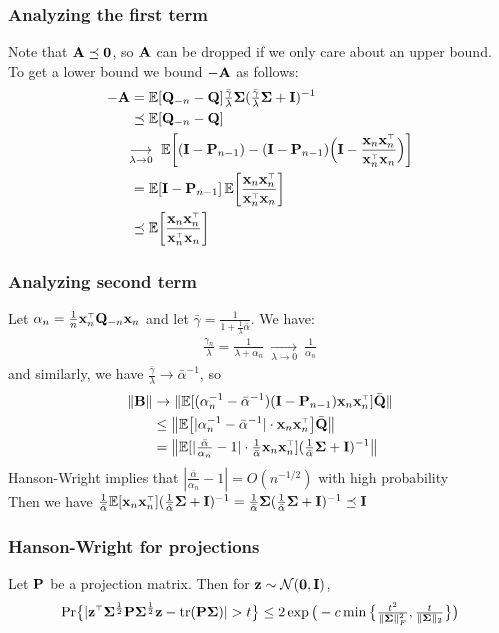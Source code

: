 \documentclass[10pt]{beamer}
\begin{document}
\begin{frame}
  \frametitle{Analyzing the first term}
  Note that $\A\preceq\zero$, so $\A$ can be dropped if we only care
  about an upper bound. To get a lower bound we bound $-\A$ as follows:
  \begin{align*}
    -\A &=
    \E[\Q_{-n}-\Q]\tfrac{\bar\gamma}{\lambda}\Sigmab
          (\tfrac{\bar\gamma}{\lambda}\Sigmab+\I)^{-1} \\
        &\preceq \E[\Q_{-n}-\Q]\\
    &\!\!\underset{\lambda\rightarrow 0}{\longrightarrow} \
      \E\bigg[(\I-\P_{n-1}) -
      (\I-\P_{n-1})\Big(\I-\frac{\x_n\x_n^\top}{\x_n^\top\x_n}\Big)\bigg]\\
        &=\E[\I-\P_{n-1}]\,\E\bigg[\frac{\x_n\x_n^\top}{\x_n^\top\x_n}\bigg]\\
    &\preceq \E\bigg[\frac{\x_n\x_n^\top}{\x_n^\top\x_n}\bigg]
  \end{align*}
\end{frame}

\begin{frame}
\frametitle{Analyzing second term}
Let $\alpha_n=\frac1n\x_n^\top\Q_{-n}\x_n$ and let
$\bar\gamma=\frac1{1+\frac1{\lambda}\bar\alpha}$. We have:
\begin{align*}
  \tfrac{\gamma_n}\lambda = \frac1{\lambda + \alpha_n}
  \ \underset{\lambda\rightarrow 0}{\longrightarrow}\ \frac
  1{\alpha_n}
\end{align*}
and similarly, we have $\frac{\bar\gamma}{\lambda}\rightarrow \bar\alpha^{-1}$, so
\begin{align*}
  \|\B\|
  & \rightarrow
    \|\E[(\alpha_n^{-1}-\bar\alpha^{-1})(\I-\P_{n-1})\x_n\x_n^\top]\bar\Q\|\\
  &\leq \big\|\E\big[|\alpha_n^{-1}-\bar\alpha^{-1}|\cdot
    \x_n\x_n^\top \big]\bar\Q \big\|\\
  &=
    \big\|\E[|\tfrac{\bar\alpha}{\alpha_n}-1|\cdot
    \tfrac1{\bar\alpha}\x_n\x_n^\top](\tfrac1{\bar\alpha}\Sigmab+\I)^{-1}\big\| 
\end{align*}
Hanson-Wright implies that $|\frac{\bar\alpha}{\alpha_n}-1| =
O(n^{-1/2})$ with high probability\\
Then we have
$\frac1{\bar\alpha}\E[\x_n\x_n^\top](\tfrac1{\bar\alpha}\Sigmab+\I)^{-1}
=\frac1{\bar\alpha}\Sigmab (\tfrac1{\bar\alpha}\Sigmab+\I)^{-1}\preceq \I$
\end{frame}

\begin{frame}
  \frametitle{Hanson-Wright for projections}
  Let $\P$ be a projection matrix. Then for $\z\sim\Nc(\zero,\I)$,
  \begin{align*}
    \Pr\big\{|\z^\top\Sigmab^{\frac12}\P\Sigmab^{\frac12}\z -
    \tr(\P\Sigmab)|>t\big\}
    \leq 2\exp\big(-c\min\big\{\tfrac{t^2}{\|\Sigmab\|_F^2},\tfrac t{\|\Sigmab\|_2}\big\}\big)
  \end{align*}
\end{frame}
\end{document}
